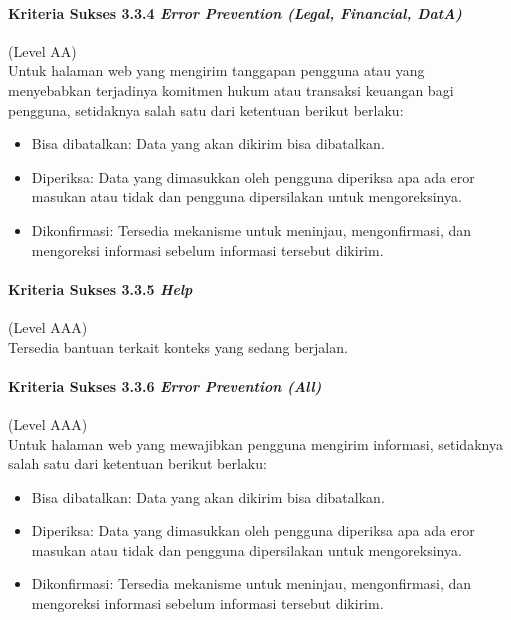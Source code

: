 \paragraph{Kriteria Sukses 3.3.4 \textit{Error Prevention (Legal, Financial, DatA)\\}}
\label{sec:kriteria_sukses_3.3.4}
(Level AA)\\

Untuk halaman web yang mengirim tanggapan pengguna atau yang menyebabkan terjadinya komitmen hukum atau transaksi keuangan bagi pengguna, setidaknya salah satu dari ketentuan berikut berlaku:
\begin{itemize}
	\item Bisa dibatalkan: Data yang akan dikirim bisa dibatalkan.
	\item Diperiksa: Data yang dimasukkan oleh pengguna diperiksa apa ada eror masukan atau tidak dan pengguna dipersilakan untuk mengoreksinya.
	\item Dikonfirmasi: Tersedia mekanisme untuk meninjau, mengonfirmasi, dan mengoreksi informasi sebelum informasi tersebut dikirim.
\end{itemize}

\paragraph{Kriteria Sukses 3.3.5 \textit{Help}}
\label{sec:kriteria_sukses_3.3.5}
(Level AAA)\\

Tersedia bantuan terkait konteks yang sedang berjalan.

\paragraph{Kriteria Sukses 3.3.6 \textit{Error Prevention (All)}}
\label{sec:kriteria_sukses_3.3.6}
(Level AAA)\\

Untuk halaman web yang mewajibkan pengguna mengirim informasi, setidaknya salah satu dari ketentuan berikut berlaku:
\begin{itemize}
	\item Bisa dibatalkan: Data yang akan dikirim bisa dibatalkan.
	\item Diperiksa: Data yang dimasukkan oleh pengguna diperiksa apa ada eror masukan atau tidak dan pengguna dipersilakan untuk mengoreksinya.
	\item Dikonfirmasi: Tersedia mekanisme untuk meninjau, mengonfirmasi, dan mengoreksi informasi sebelum informasi tersebut dikirim.
\end{itemize}

